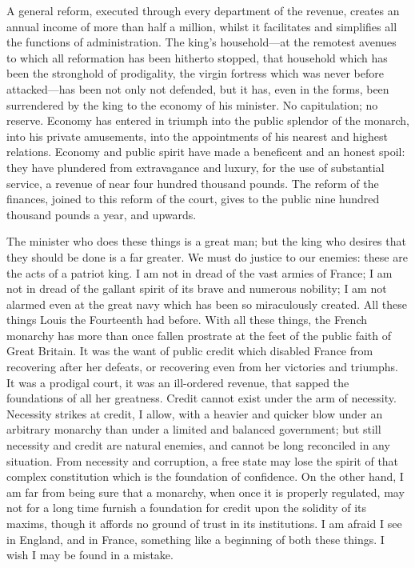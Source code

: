 A general reform, executed through every department of the revenue, creates an annual income of more than half a million, whilst it facilitates and simplifies all the functions of administration. The king's household—at the remotest avenues to which all reformation has been hitherto stopped, that household which has been the stronghold of prodigality, the virgin fortress which was never before attacked—has been not only not defended, but it has, even in the forms, been surrendered by the king to the economy of his minister. No capitulation; no reserve. Economy has entered in triumph into the public splendor of the monarch, into his private amusements, into the appointments of his nearest and highest relations. Economy and public spirit have made a beneficent and an honest spoil: they have plundered from extravagance and luxury, for the use of substantial service, a revenue of near four hundred thousand pounds. The reform of the finances, joined to this reform of the court, gives to the public nine hundred thousand pounds a year, and upwards.

The minister who does these things is a great man; but the king who desires that they should be done is a far greater. We must do justice to our enemies: these are the acts of a patriot king. I am not in dread of the vast armies of France; I am not in dread of the gallant spirit of its brave and numerous nobility; I am not alarmed even at the great navy which has been so miraculously created. All these things Louis the Fourteenth had before. With all these things, the French monarchy has more than once fallen prostrate at the feet of the public faith of Great Britain. It was the want of public credit which disabled France from recovering after her defeats, or recovering even from her victories and triumphs. It was a prodigal court, it was an ill-ordered revenue, that sapped the foundations of all her greatness. Credit cannot exist under the arm of necessity. Necessity strikes at credit, I allow, with a heavier and quicker blow under an arbitrary monarchy than under a limited and balanced government; but still necessity and credit are natural enemies, and cannot be long reconciled in any situation. From necessity and corruption, a free state may lose the spirit of that complex constitution which is the foundation of confidence. On the other hand, I am far from being sure that a monarchy, when once it is properly regulated, may not for a long time furnish a foundation for credit upon the solidity of its maxims, though it affords no ground of trust in its institutions. I am afraid I see in England, and in France, something like a beginning of both these things. I wish I may be found in a mistake.

